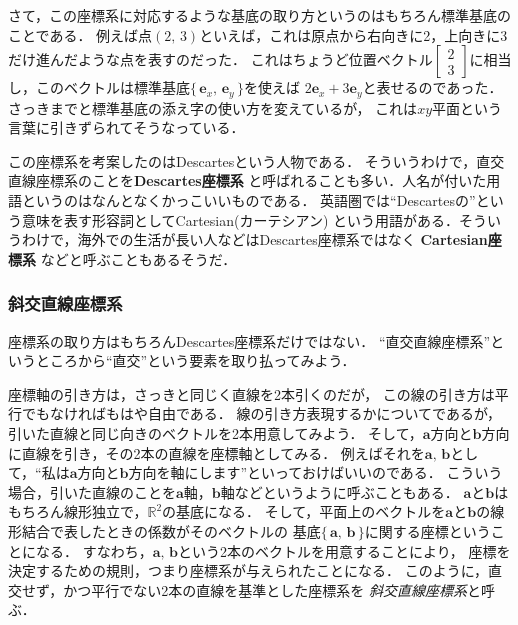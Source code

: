 さて，この座標系に対応するような基底の取り方というのはもちろん標準基底のことである．
例えば点$(2, \, 3)$といえば，これは原点から右向きに2，上向きに3だけ進んだような点を表すのだった．
これはちょうど位置ベクトル$\left[ 
\begin{array}{c}
2 \\
3
\end{array}
\right] $に相当し，このベクトルは標準基底$ \{ \, \bm{e}_x, \, \bm{e}_y \, \} $を使えば
$2\bm{e}_x+3\bm{e}_y$と表せるのであった．さっきまでと標準基底の添え字の使い方を変えているが，
これは$xy$平面という言葉に引きずられてそうなっている．

この座標系を考案したのはDescartesという人物である．
そういうわけで，直交直線座標系のことを\textbf{Descartes座標系}
と呼ばれることも多い．人名が付いた用語というのはなんとなくかっこいいものである．
英語圏では``Descartesの''という意味を表す形容詞としてCartesian(カーテシアン)
という用語がある．そういうわけで，海外での生活が長い人などはDescartes座標系ではなく
\textbf{Cartesian座標系}
などと呼ぶこともあるそうだ．

\subsubsection{斜交直線座標系}
座標系の取り方はもちろんDescartes座標系だけではない．
``直交直線座標系''というところから``直交''という要素を取り払ってみよう．

座標軸の引き方は，さっきと同じく直線を2本引くのだが，
この線の引き方は平行でもなければもはや自由である．
線の引き方表現するかについてであるが，
引いた直線と同じ向きのベクトルを2本用意してみよう．
そして，$\bm{a}$方向と$\bm{b}$方向に直線を引き，その2本の直線を座標軸としてみる．
例えばそれを$\bm{a}, \, \bm{b}$として，``私は$\bm{a}$方向と$\bm{b}$方向を軸にします''といっておけばいいのである．
こういう場合，引いた直線のことを$\bm{a}$軸，$\bm{b}$軸などというように呼ぶこともある．
$\bm{a}$と$\bm{b}$はもちろん線形独立で，$\mathbb{R}^2$の基底になる．
そして，平面上のベクトルを$\bm{a}$と$\bm{b}$の線形結合で表したときの係数がそのベクトルの
基底$\{ \, \bm{a}, \, \bm{b} \, \} $に関する座標ということになる．
すなわち，$\bm{a}, \, \bm{b}$という2本のベクトルを用意することにより，
座標を決定するための規則，つまり座標系が与えられたことになる．
このように，直交せず，かつ平行でない2本の直線を基準とした座標系を
\emph{斜交直線座標系}と呼ぶ．

